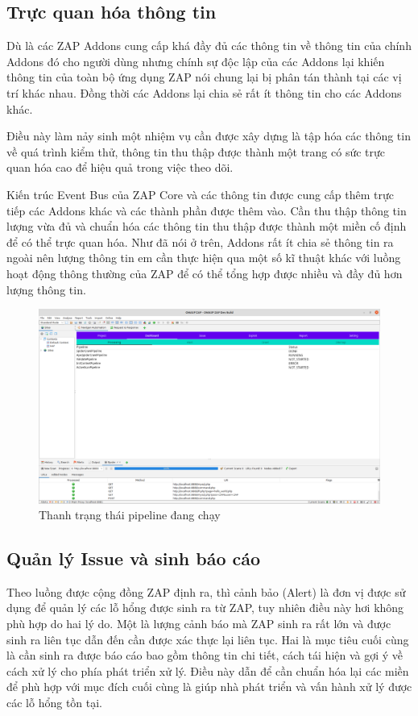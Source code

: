 \documentclass[./../main.tex]{subfiles}
\begin{document}
\subsection{Trực quan hóa thông tin}
Dù là các ZAP Addons cung cấp khá đầy đủ các thông tin về thông tin của chính Addons đó cho người dùng nhưng chính sự độc lập của các Addons lại khiến thông tin của toàn bộ ứng dụng ZAP nói chung lại bị phân tán thành tại các vị trí khác nhau. Đồng thời các Addons lại chia sẻ rất ít thông tin cho các Addons khác.

Điều này làm nảy sinh một nhiệm vụ cần được xây dựng là tập hóa các thông tin về quá trình kiểm thử, thông tin thu thập được thành một trang có sức trực quan hóa cao để hiệu quả trong việc theo dõi.

Kiến trúc Event Bus của ZAP Core và các thông tin được cung cấp thêm trực tiếp các Addons khác và các thành phần được thêm vào. Cần thu thập thông tin lượng vừa đủ và chuẩn hóa các thông tin thu thập được thành một miền cố định để có thể trực quan hóa. Như đã nói ở trên, Addons rất ít chia sẻ thông tin ra ngoài nên lượng thông tin em cần thực hiện qua một số kĩ thuật khác với luồng hoạt động thông thường của ZAP để có thể tổng hợp được nhiều và đầy đủ hơn lượng thông tin.

\begin{figure}[H]
	\includegraphics[width=\linewidth]{./images/state.png}
	\caption{Thanh trạng thái pipeline đang chạy}
	\label{fig:state}
\end{figure}

\subsection{Quản lý Issue và sinh báo cáo}
Theo luồng được cộng đồng ZAP định ra, thì cảnh bảo (Alert) là đơn vị được sử dụng để quản lý các lỗ hổng được sinh ra từ ZAP, tuy nhiên điều này hơi không phù hợp do hai lý do. Một là lượng cảnh báo mà ZAP sinh ra rất lớn và được sinh ra liên tục dẫn đến cần được xác thực lại liên tục. Hai là mục tiêu cuối cùng là cần sinh ra được báo cáo bao gồm thông tin chi tiết, cách tái hiện và gợi ý về cách xử lý cho phía phát triển xử lý. Điều này dẫn để cần chuẩn hóa lại các miền để phù hợp với mục đích cuối cùng là giúp nhà phát triển và vấn hành xử lý được các lỗ hổng tồn tại.
\end{document}

